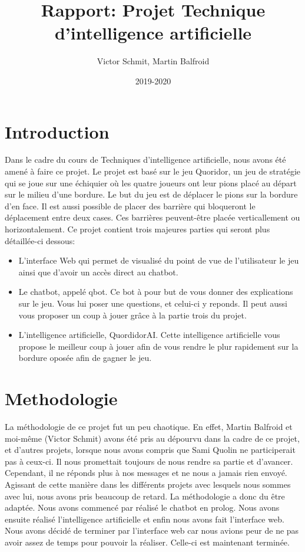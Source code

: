 \documentclass{article}
\title{Rapport: Projet Technique d'intelligence artificielle}
\author{Victor Schmit, Martin Balfroid}
\date{2019-2020}
\begin{document}
\begin{titlepage}
\maketitle
\end{titlepage}

\tableofcontents
\pagebreak
\section{Introduction}
Dans le cadre du cours de Techniques d'intelligence artificielle, nous avons été amené à faire ce projet. Le projet est basé sur le jeu Quoridor, un jeu de stratégie qui se joue sur une échiquier où les quatre joueurs ont leur pions placé au départ sur le milieu d'une bordure. Le but du jeu est de déplacer le pions sur la bordure d'en face. Il est aussi possible de placer des barrière qui bloqueront le déplacement entre deux cases. Ces barrières peuvent-être placée verticallement ou horizontalement.
Ce projet contient trois majeures parties qui seront plus détaillée-ci dessous:
\\
\begin{itemize}
	\item L'interface Web qui permet de visualisé du point de vue de l'utilisateur le jeu ainsi que d'avoir un accès direct au chatbot.
	\item Le chatbot, appelé qbot. Ce bot à pour but de vous donner des explications sur le jeu. Vous lui poser une questions, et celui-ci y reponds. Il peut aussi vous proposer un coup à jouer grâce à la partie trois du projet.
	\item L'intelligence artificielle, QuordidorAI. Cette intelligence artificielle vous propose le meilleur coup à jouer afin de vous rendre le plur rapidement sur la bordure oposée afin de gagner le jeu.
\end{itemize}
\pagebreak

\section{Methodologie}
La méthodologie de ce projet fut un peu chaotique. En effet, Martin Balfroid et moi-même (Victor Schmit) avons été pris au dépourvu dans la cadre de ce projet, et d'autres projets, lorsque nous avons compris que Sami Quolin ne participerait pas à ceux-ci. Il nous promettait toujours de nous rendre sa partie et d'avancer. Cependant, il ne réponds plus à nos messages et ne nous a jamais rien envoyé. Agissant de cette manière dans les différents projets avec lesquels nous sommes avec lui, nous avons pris beaucoup de retard. La méthodologie a donc du être adaptée. Nous avons commencé par réalisé le chatbot en prolog. Nous avons ensuite réalisé l'intelligence artificielle et enfin nous avons fait l'interface web.
Nous avons décidé de terminer par l'interface web car nous avions peur de ne pas avoir assez de temps pour pouvoir la réaliser. Celle-ci est maintenant terminée.
\pagebreak
\end{document}
